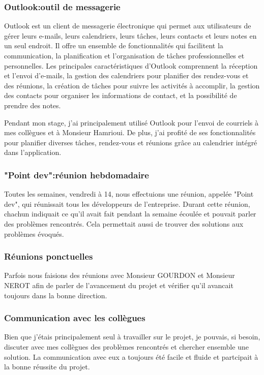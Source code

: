 \documentclass[a4paper, 12pt, french]{article}
\begin{document}
				\subsubsection{Outlook:outil de messagerie}%
					Outlook est un client de messagerie électronique qui permet aux utilisateurs de gérer leurs e-mails, leurs calendriers, leurs tâches, leurs contacts et leurs notes en un seul endroit. Il offre un ensemble de fonctionnalités qui facilitent la communication, la planification et l'organisation de tâches professionnelles et personnelles. Les principales caractéristiques d'Outlook comprennent la réception et l'envoi d'e-mails, la gestion des calendriers pour planifier des rendez-vous et des réunions, la création de tâches pour suivre les activités à accomplir, la gestion des contacts pour organiser les informations de contact, et la possibilité de prendre des notes.

					Pendant mon stage, j'ai principalement utilisé Outlook pour l'envoi de courriels à mes collègues et à Monsieur Hamrioui. De plus, j'ai profité de ses fonctionnalités pour planifier diverses tâches, rendez-vous et réunions grâce au calendrier intégré dans l'application.

				\subsubsection{"Point dev":réunion hebdomadaire}
					Toutes les semaines, vendredi à 14, nous effectuions une réunion, appelée "Point dev", qui réunissait tous les développeurs de l'entreprise. Durant cette réunion, chachun indiquait ce qu'il avait fait pendant la semaine écoulée et pouvait parler des problèmes rencontrés. Cela permettait aussi de trouver des solutions aux problèmes évoqués.

				\subsubsection{Réunions ponctuelles}
					Parfois nous faisions des réunions avec Monsieur GOURDON et Monsieur NEROT afin de parler de l'avancement du projet et vérifier qu'il avancait toujours dans la bonne direction.

				\subsubsection{Communication avec les collègues}
					Bien que j'étais principalement seul à travailler sur le projet, je pouvais, si besoin, discuter avec mes collègues des problèmes rencontrés et chercher ensemble une solution. La communication avec eux a toujours été facile et fluide et partcipait à la bonne réussite du projet.
			
\end{document}
